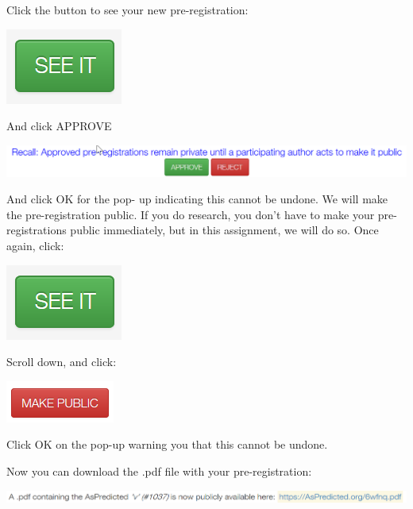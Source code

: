 \documentclass[
  oneside]{krantz}
\begin{document}
Click the button to see your new pre-registration:

\begin{center}\includegraphics[width=0.2\linewidth]{images/5623f5d1b8144f8cdc09d955eaf4a3b7} \end{center}

And click APPROVE

\begin{center}\includegraphics[width=1\linewidth]{images/6c3b919ae37f5dfed14761209592f337} \end{center}

And click OK for the pop- up indicating this cannot be undone. We will make the
pre-registration public. If you do research, you don't have to make your
pre-registrations public immediately, but in this assignment, we will do so.
Once again, click:

\begin{center}\includegraphics[width=0.2\linewidth]{images/5623f5d1b8144f8cdc09d955eaf4a3b7} \end{center}

Scroll down, and click:

\begin{center}\includegraphics[width=0.2\linewidth]{images/94a843f900ec4dcbb75f60686edac510} \end{center}

Click OK on the pop-up warning you that this cannot be undone.

Now you can download the .pdf file with your pre-registration:

\begin{center}\includegraphics[width=1\linewidth]{images/87e9befad90809fbccf7be6898f5d183} \end{center}
\end{document}
